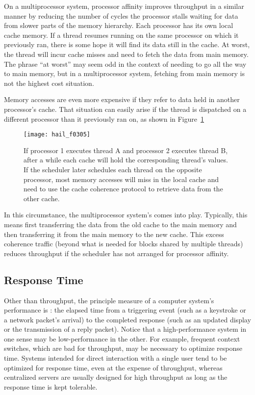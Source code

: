 On a multiprocessor system, processor affinity improves throughput in
a similar manner by reducing the number of cycles the processor
stalls waiting for data from slower parts of the memory hierarchy.
Each processor has its own local cache
memory.  If a thread resumes running on the same processor on which it
previously ran, there is some hope it will find its data still in
the cache.  At worst, the thread will incur cache misses and need to
fetch the data from main memory.  The phrase ``at worst'' may seem odd
in the context of needing to go all the way to main memory, but in a
multiprocessor system, fetching from main memory is not the highest
cost situation.

Memory accesses are even more expensive if they refer
to data held in another processor's cache.  That situation can easily
arise if the thread is dispatched on a different processor than it
previously ran on, as shown in Figure~\ref{scan-3-3}
\begin{figure}
\centerline{\texttt{[image: hail\_f0305]}}
\caption{If processor 1 executes thread A and processor 2 executes
  thread B, after a while each cache will hold the corresponding
  thread's values.  If the scheduler later
  schedules each thread on the opposite processor, most
  memory accesses will miss in the local cache and need to use the
  cache coherence protocol to retrieve data from the other cache.}
\label{scan-3-3}
\end{figure}
In this circumstance, the multiprocessor system's
 comes into play.  Typically, this means first
transferring the data from the old cache to the main memory and then
transferring it from the main memory to the new cache.  This excess
coherence traffic (beyond what is needed for blocks shared by multiple
threads) reduces throughput if the scheduler has not arranged for
processor affinity.

\subsection{Response Time}\label{response-time-section}

Other than throughput, the principle measure of a computer system's
performance is : the elapsed time from a triggering event (such as
a keystroke or a network packet's arrival) to the completed response
(such as an updated display or the transmission of a reply packet).
Notice that a high-performance system in one sense may be
low-performance in the other.  For example, frequent context switches,
which are bad for throughput, may be necessary to optimize
response time.  Systems intended for direct interaction with a single
user tend to be optimized for response time, even at the expense of
throughput, whereas centralized servers are usually designed for high
throughput as long as the response time is kept tolerable.

